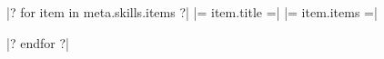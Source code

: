 

\begin{cvskills}

|? for item in meta.skills.items ?|
  \cvskill
    {|= item.title =|} %
    {|= item.items =|} %
  
|? endfor ?|

\end{cvskills}
